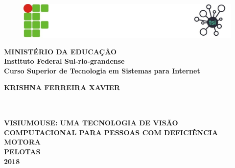 \thispagestyle{empty}

\vfill
 \begin{center}

		\begin{figure}[t]
			\centering
			\includegraphics{figures/logo-ifsul-pelotas-tsi.jpg}	
		\end{figure}

\begin{spacing}{1.5}
{\large\bfseries 
MINISTÉRIO DA EDUCAÇÃO \\
Instituto Federal Sul-rio-grandense \\
Curso Superior de Tecnologia em Sistemas para Internet 
} 
\\
 
 \end{spacing}

    \vspace*{1in}
    \begin{large} \bfseries KRISHNA FERREIRA XAVIER\end{large}\\[0.4in]

    \vspace*{4cm}
    \noindent \\
    \large\bfseries{VISIUMOUSE: UMA TECNOLOGIA DE VISÃO COMPUTACIONAL PARA PESSOAS COM DEFICIÊNCIA MOTORA} \\
    \vfill
    \large\bfseries{PELOTAS \\ 2018}
\end{center}

\normalsize

